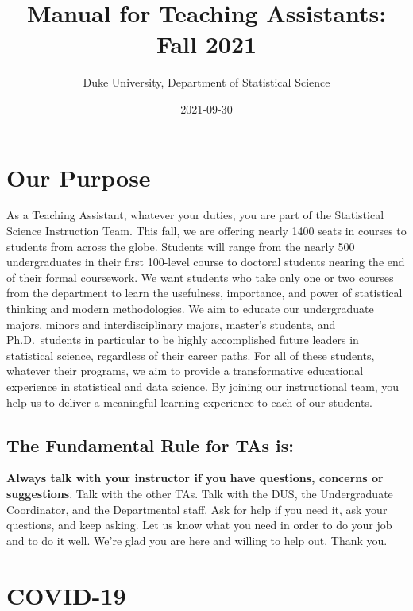 \documentclass[
]{article}
\title{Manual for Teaching Assistants: Fall 2021}
\author{Duke University, Department of Statistical Science}
\date{2021-09-30}
\begin{document}
\maketitle

{
\setcounter{tocdepth}{2}
\tableofcontents
}
\hypertarget{our-purpose}{%
\section{Our Purpose}\label{our-purpose}}

As a Teaching Assistant, whatever your duties, you are part of the Statistical Science Instruction Team. This fall, we are offering nearly 1400 seats in courses to students from across the globe. Students will range from the nearly 500 undergraduates in their first 100-level course to doctoral students nearing the end of their formal coursework. We want students who take only one or two courses from the department to learn the usefulness, importance, and power of statistical thinking and modern methodologies. We aim to educate our undergraduate majors, minors and interdisciplinary majors, master's students, and Ph.D.~students in particular to be highly accomplished future leaders in statistical science, regardless of their career paths. For all of these students, whatever their programs, we aim to provide a transformative educational experience in statistical and data science. By joining our instructional team, you help us to deliver a meaningful learning experience to each of our students.

\hypertarget{the-fundamental-rule-for-tas-is}{%
\subsection{The Fundamental Rule for TAs is:}\label{the-fundamental-rule-for-tas-is}}

\textbf{Always talk with your instructor if you have questions, concerns or suggestions}. Talk with the other TAs. Talk with the DUS, the Undergraduate Coordinator, and the Departmental staff. Ask for help if you need it, ask your questions, and keep asking. Let us know what you need in order to do your job and to do it well. We're glad you are here and willing to help out. Thank you.

\hypertarget{covid-19}{%
\section{COVID-19}\label{covid-19}}
\end{document}
